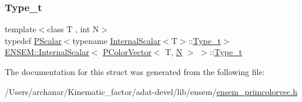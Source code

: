 \mbox{\label{structENSEM_1_1InternalScalar_3_01PColorVector_3_01T_00_01N_01_4_01_4_a24a574d9378f5b76122d29737f62fbfd}} 
\subsubsection{\texorpdfstring{Type\_t}{Type\_t}\hspace{0.1cm}{\footnotesize\ttfamily [3/3]}}
{\footnotesize\ttfamily template$<$class T , int N$>$ \\
typedef \mbox{\hyperlink{classENSEM_1_1PScalar}{P\+Scalar}}$<$typename \mbox{\hyperlink{structENSEM_1_1InternalScalar}{Internal\+Scalar}}$<$T$>$\+::\mbox{\hyperlink{structENSEM_1_1InternalScalar_3_01PColorVector_3_01T_00_01N_01_4_01_4_a24a574d9378f5b76122d29737f62fbfd}{Type\+\_\+t}}$>$ \mbox{\hyperlink{structENSEM_1_1InternalScalar}{E\+N\+S\+E\+M\+::\+Internal\+Scalar}}$<$ \mbox{\hyperlink{classENSEM_1_1PColorVector}{P\+Color\+Vector}}$<$ T, \mbox{\hyperlink{adat__devel_2lib_2hadron_2operator__name__util_8cc_a7722c8ecbb62d99aee7ce68b1752f337}{N}} $>$ $>$\+::\mbox{\hyperlink{structENSEM_1_1InternalScalar_3_01PColorVector_3_01T_00_01N_01_4_01_4_a24a574d9378f5b76122d29737f62fbfd}{Type\+\_\+t}}}



The documentation for this struct was generated from the following file\+:\begin{DoxyCompactItemize}
\item 
/\+Users/archanar/\+Kinematic\+\_\+factor/adat-\/devel/lib/ensem/\mbox{\hyperlink{adat-devel_2lib_2ensem_2ensem__primcolorvec_8h}{ensem\+\_\+primcolorvec.\+h}}\end{DoxyCompactItemize}
